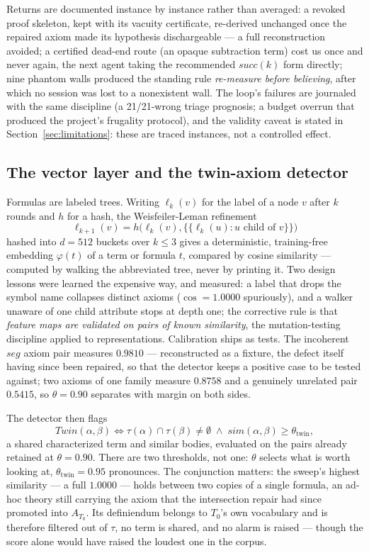 \documentclass[11pt]{article}
\theoremstyle{remark}\newtheorem{example}{Example}
\begin{document}
Returns are documented instance by instance rather than averaged: a revoked proof
skeleton, kept with its vacuity certificate, re-derived unchanged once the repaired
axiom made its hypothesis dischargeable --- a full reconstruction avoided; a
certified dead-end route (an opaque subtraction term) cost us once and never again,
the next agent taking the recommended $\mathit{succ}(k)$ form directly; nine phantom
walls produced the standing rule \emph{re-measure before believing}, after which no
session was lost to a nonexistent wall. The loop's failures are journaled with the
same discipline (a 21/21-wrong triage prognosis; a budget overrun that produced the
project's frugality protocol), and the validity caveat is stated in
Section~\ref{sec:limitations}: these are traced instances, not a controlled effect.

\subsection{The vector layer and the twin-axiom detector}
Formulas are labeled trees. Writing $\ell_k(v)$ for the label of a node $v$ after $k$
rounds and $h$ for a hash, the Weisfeiler-Leman refinement
\[ \ell_{k+1}(v) = h\bigl(\ell_k(v), \{\!\!\{\ell_k(u) : u \text{ child of } v\}\!\!\}\bigr) \]
hashed into $d{=}512$ buckets over $k \le 3$ gives a deterministic, training-free
embedding $\varphi(t)$ of a term or formula $t$, compared by cosine similarity ---
computed by walking the abbreviated
tree, never by printing it. Two design lessons were learned the expensive way, and
measured: a label that
drops the symbol name collapses distinct axioms ($\cos = 1.0000$ spuriously), and a
walker unaware of one child attribute stops at depth one; the corrective rule is that
\emph{feature maps are validated on pairs of known similarity}, the mutation-testing
discipline applied to representations. Calibration ships as tests. The incoherent
$\mathit{seg}$ axiom pair measures $0.9810$ --- reconstructed as a fixture, the defect
itself having since been repaired, so that the detector keeps a positive case to be
tested against; two axioms of one family measure $0.8758$ and a genuinely unrelated
pair $0.5415$, so $\theta = 0.90$ separates with margin on both sides.

The detector then flags
\[ \mathit{Twin}(\alpha,\beta) \iff \tau(\alpha) \cap \tau(\beta) \neq \emptyset
   \;\wedge\; \mathit{sim}(\alpha,\beta) \geq \theta_{\mathrm{twin}} , \]
a shared characterized term and similar bodies, evaluated on the pairs already
retained at $\theta = 0.90$. There are two thresholds, not one: $\theta$ selects what
is worth looking at, $\theta_{\mathrm{twin}} = 0.95$ pronounces. The conjunction
matters: the sweep's highest similarity --- a full $1.0000$ --- holds between two
copies of a single formula, an ad-hoc theory still carrying the axiom that the
intersection repair had since promoted into $A_{T_0}$. Its definiendum belongs to
$T_0$'s own vocabulary and is therefore filtered out of $\tau$, no term is shared, and
no alarm is raised --- though the score alone would have raised the loudest one in the
corpus.
\end{document}
